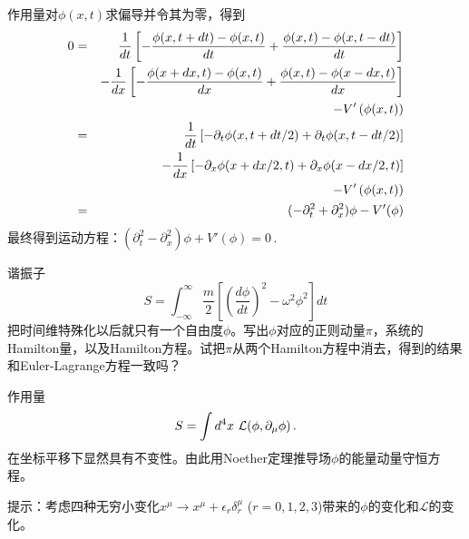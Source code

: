 \documentclass[CJK]{beamer}
\begin{document}
\begin{frame}
\bch
作用量对$\phi(x, t)$求偏导并令其为零，得到
\begin{eqnarray}
0 &=& \frac{1}{dt} \left [ -\frac{\phi(x, t+dt) - \phi(x,t)}{dt} + \frac{\phi(x, t) - \phi(x,t-dt)}{dt}\right]  \nonumber \\
  && -\frac{1}{dx}\left [- \frac{\phi(x+dx, t) - \phi(x,t)}{dx} + \frac{\phi(x, t) - \phi(x-dx,t)}{dx}\right] \nonumber \\
  && -V'\left(\phi(x, t)\right) \nonumber \\ 
  &=& \frac{1}{dt}\left[-\partial_t\phi(x, t+dt/2) + \partial_t\phi(x, t-dt/2)\right] \nonumber \\
   &&- \frac{1}{dx}\left[-\partial_x\phi(x+dx/2, t) + \partial_x\phi(x-dx/2, t)\right] \nonumber \\
   &&-  V'\left(\phi(x, t)\right)  \nonumber \\
  &=& (- \partial_t^2 + \partial_x^2 )\phi - V'(\phi) \nonumber 
\end{eqnarray}
最终得到运动方程：$(\partial_t^2 - \partial_x^2 )\phi + V'(\phi) = 0 \,.$
\ech
\end{frame}


\begin{frame}
\bch
谐振子
$$ S = \int_{-\infty}^\infty \frac{m}{2}\left[(\frac{d\phi}{dt})^2 - \omega^2\phi^2\right] dt$$
把时间维特殊化以后就只有一个自由度$\phi$。写出$\phi$对应的正则动量$\pi$，系统的Hamilton量，以及Hamilton方程。试把$\pi$从两个Hamilton方程中消去，得到的结果和Euler-Lagrange方程一致吗？
\ech
\end{frame}


\begin{frame}
\bch
作用量
$$S = \int d^4x\ {\mathcal{L}}(\phi, \partial_\mu\phi)\,.$$
在坐标平移下显然具有不变性。由此用Noether定理推导场$\phi$的能量动量守恒方程。

\skipline

提示：考虑四种无穷小变化$x^\mu \rightarrow x^\mu + \epsilon_r \delta_r^\mu$ ($r = 0, 1, 2, 3$)带来的$\phi$的变化和$\mathcal{L}$的变化。
\ech
\end{frame}
\end{document}
